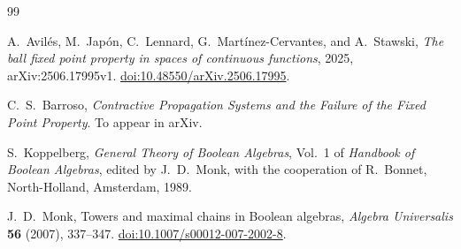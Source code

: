 \documentclass[preprint,12pt,nopreprintline]{elsarticle}
\theoremstyle{definition}
\theoremstyle{remark}
\numberwithin{equation}{section}
\begin{document}
\begin{thebibliography}{99}

A.~Avil\'es, M.~Jap\'on, C.~Lennard, G.~Mart\'inez-Cervantes, and
A.~Stawski, \emph{The ball fixed point property in spaces of continuous
functions}, 2025, arXiv:2506.17995v1.
\href{https://doi.org/10.48550/arXiv.2506.17995}{doi:10.48550/arXiv.2506.17995}.

C.~S.~Barroso, \emph{Contractive Propagation Systems and the Failure
of the Fixed Point Property}. To appear in arXiv.

S.~Koppelberg, \emph{General Theory of Boolean Algebras},
Vol.~1 of \emph{Handbook of Boolean Algebras},
edited by J.~D.~Monk, with the cooperation of R.~Bonnet,
North-Holland, Amsterdam, 1989.

J.~D.~Monk, Towers and maximal chains in Boolean algebras,
\emph{Algebra Universalis} \textbf{56} (2007), 337--347.
\href{https://doi.org/10.1007/s00012-007-2002-8}{doi:10.1007/s00012-007-2002-8}.

\end{thebibliography}
\end{document}
